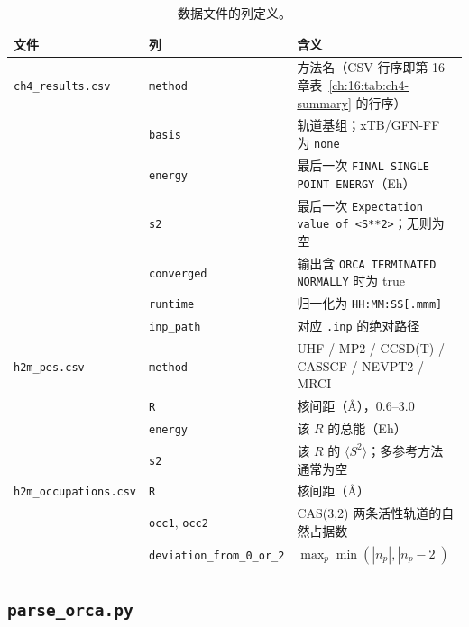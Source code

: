 {\small
\begin{table}[h]
\centering
\caption{数据文件的列定义。}
\label{app:tab:csv}
\begin{tabular}{@{}l l p{7.2cm}@{}}
\toprule
文件 & 列 & 含义 \\
\midrule
\texttt{ch4\_results.csv} & \texttt{method} & 方法名（CSV 行序即第 16 章表~\ref{ch:16:tab:ch4-summary} 的行序） \\
 & \texttt{basis} & 轨道基组；xTB/GFN-FF 为 \texttt{none} \\
 & \texttt{energy} & 最后一次 \texttt{FINAL SINGLE POINT ENERGY}（Eh） \\
 & \texttt{s2} & 最后一次 \texttt{Expectation value of <S**2>}；无则为空 \\
 & \texttt{converged} & 输出含 \texttt{ORCA TERMINATED NORMALLY} 时为 true \\
 & \texttt{runtime} & 归一化为 \texttt{HH:MM:SS[.mmm]} \\
 & \texttt{inp\_path} & 对应 \texttt{.inp} 的绝对路径 \\
\midrule
\texttt{h2m\_pes.csv} & \texttt{method} & UHF / MP2 / CCSD(T) / CASSCF / NEVPT2 / MRCI \\
 & \texttt{R} & 核间距（\AA），0.6--3.0 \\
 & \texttt{energy} & 该 $R$ 的总能（Eh） \\
 & \texttt{s2} & 该 $R$ 的 $\langle S^2\rangle$；多参考方法通常为空 \\
\midrule
\texttt{h2m\_occupations.csv} & \texttt{R} & 核间距（\AA） \\
 & \texttt{occ1}, \texttt{occ2} & CAS(3,2) 两条活性轨道的自然占据数 \\
 & \texttt{deviation\_from\_0\_or\_2} & $\max_p\min(|n_p|,|n_p-2|)$ \\
\bottomrule
\end{tabular}
\end{table}
}

\subsection{\texttt{parse\_orca.py}}

